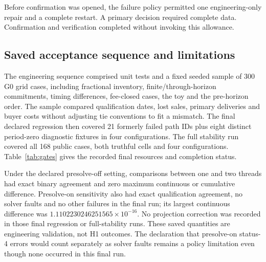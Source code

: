 \documentclass[preprint,11pt,authoryear]{elsarticle}
\begin{document}
Before confirmation was opened, the failure policy permitted one engineering-only repair and a complete restart. A primary decision required complete data. Confirmation and verification completed without invoking this allowance.

\subsection{Saved acceptance sequence and limitations}
The engineering sequence comprised unit tests and a fixed seeded sample of 300 G0 grid cases, including fractional inventory, finite/through-horizon commitments, timing differences, fee-closed cases, the toy and the pre-horizon order. The sample compared qualification dates, lost sales, primary deliveries and buyer costs without adjusting tie conventions to fit a mismatch. The final declared regression then covered 21 formerly failed path IDs plus eight distinct period-zero diagnostic fixtures in four configurations. The full stability run covered all 168 public cases, both truthful cells and four configurations. Table~\ref{tab:gates} gives the recorded final resources and completion status.

Under the declared presolve-off setting, comparisons between one and two threads had exact binary agreement and zero maximum continuous or cumulative difference. Presolve-on sensitivity also had exact qualification agreement, no solver faults and no other failures in the final run; its largest continuous difference was $1.1102230246251565\times10^{-16}$. No projection correction was recorded in those final regression or full-stability runs. These saved quantities are engineering validation, not H1 outcomes. The declaration that presolve-on status-4 errors would count separately as solver faults remains a policy limitation even though none occurred in this final run.
\end{document}
